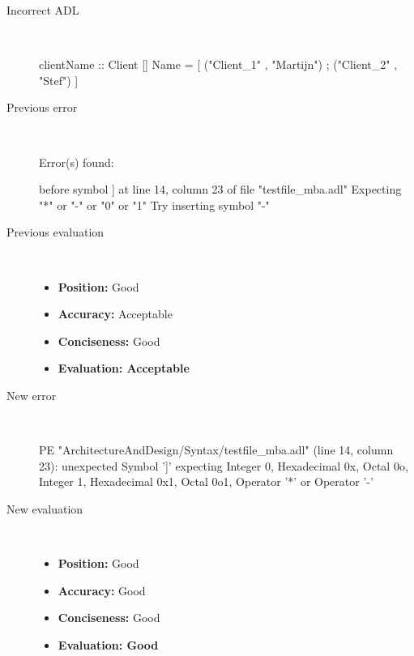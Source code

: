\begin{description}
  \item[Incorrect ADL]~\\
\begin{adl}
clientName :: Client [] Name =
    [ ("Client_1"      , "Martijn")
    ; ("Client_2"      , "Stef")
    ]\end{adl}
  \item[Previous error]~\\
\begin{haskell}
Error(s) found:

before symbol ] at line 14, column 23 of file "testfile_mba.adl"
Expecting "*" or "-" or "0" or "1"
Try inserting symbol "-"

\end{haskell}
  \item[Previous evaluation]~\\
    \begin{itemize}
    \item \textbf{Position:} Good
    \item \textbf{Accuracy:} Acceptable
    \item \textbf{Conciseness:} Good
    \item \textbf{Evaluation: Acceptable}
    \end{itemize}
  \item[New error]~\\
\begin{haskell}
PE "ArchitectureAndDesign/Syntax/testfile_mba.adl" (line 14, column 23):
unexpected Symbol ']'
expecting Integer 0, Hexadecimal 0x, Octal 0o, Integer 1, Hexadecimal 0x1, Octal 0o1, Operator '*' or Operator '-'\end{haskell}
  \item[New evaluation]~\\
    \begin{itemize}
    \item \textbf{Position:} Good
    \item \textbf{Accuracy:} Good
    \item \textbf{Conciseness:} Good
    \item \textbf{Evaluation: Good}
    \end{itemize}
  \end{description}

\hrulefill

